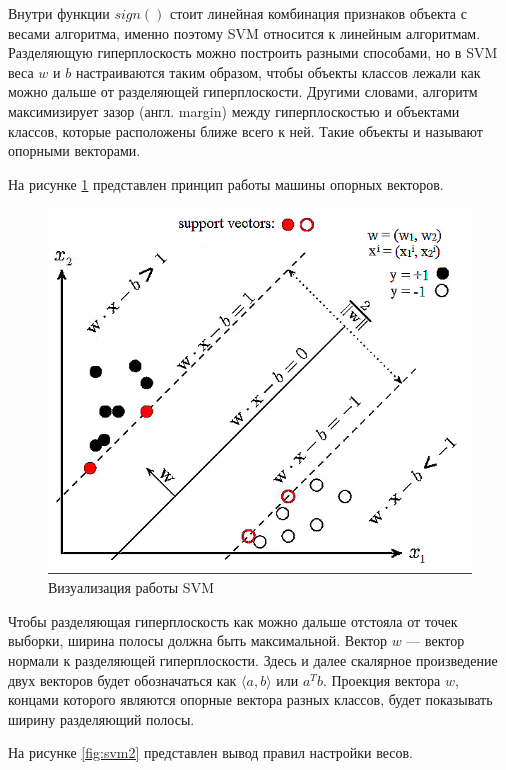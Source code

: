 Внутри функции $sign()$ стоит линейная комбинация признаков объекта с весами алгоритма, именно поэтому SVM относится к линейным алгоритмам. Разделяющую гиперплоскость можно построить разными способами, но в SVM веса $w$ и $b$ настраиваются таким образом, чтобы объекты классов лежали как можно дальше от разделяющей гиперплоскости. Другими словами, алгоритм максимизирует зазор (англ. margin) между гиперплоскостью и объектами классов, которые расположены ближе всего к ней. Такие объекты и называют опорными векторами.

На рисунке \ref{fig:svm1} представлен принцип работы машины опорных векторов.

\begin{figure}[H]
	\centering
	\includegraphics[width=\textwidth]{img/svm1.png}
	\caption{Визуализация работы SVM}
	\label{fig:svm1}
\end{figure}

Чтобы разделяющая гиперплоскость как можно дальше отстояла от точек выборки, ширина полосы должна быть максимальной. Вектор $w$ --- вектор нормали к разделяющей гиперплоскости. Здесь и далее скалярное произведение двух векторов будет обозначаться как $\langle a,b\rangle$ или $a^Tb$. Проекция вектора $w$, концами которого являются опорные вектора разных классов, будет показывать ширину разделяющий полосы.

На рисунке \ref{fig:svm2} представлен вывод правил настройки весов.


